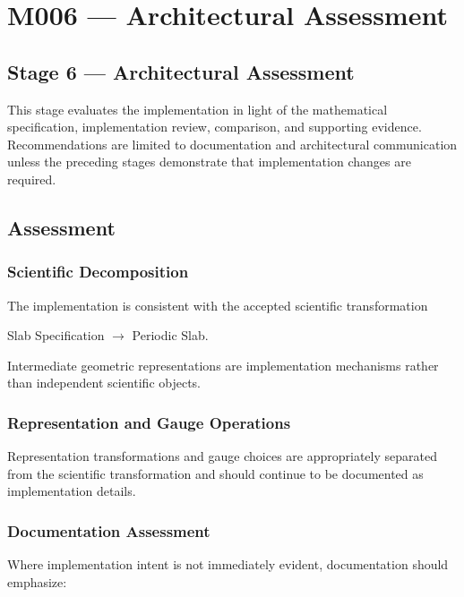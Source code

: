 \chapter{M006 --- Architectural Assessment}

\section{Stage 6 --- Architectural Assessment}

This stage evaluates the implementation in light of the mathematical
specification, implementation review, comparison, and supporting evidence.
Recommendations are limited to documentation and architectural communication
unless the preceding stages demonstrate that implementation changes are
required.

\section{Assessment}

\subsection{Scientific Decomposition}

The implementation is consistent with the accepted scientific transformation

\begin{center}
Slab Specification $\rightarrow$ Periodic Slab.
\end{center}

Intermediate geometric representations are implementation mechanisms rather
than independent scientific objects.

\subsection{Representation and Gauge Operations}

Representation transformations and gauge choices are appropriately separated
from the scientific transformation and should continue to be documented as
implementation details.

\subsection{Documentation Assessment}

Where implementation intent is not immediately evident, documentation should
emphasize:

